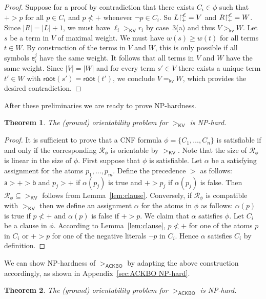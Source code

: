 \documentclass{tlp}
\newcommand{\qed}{\hspace*{1em}\hbox{\proofbox}}
\newtheorem{theorem}{Theorem}[section]
\newcommand{\m}[1]{\mathsf{#1}}
\newcommand{\mc}[1]{\mathcal{#1}}
\newcommand{\mr}[1]{\mathrm{#1}}
\newcommand{\rt}{\m{root}}
\newcommand{\Wt}{\m{w,root}}
\renewcommand{\Wt}{\m{kv}}
\newcommand{\ackbo}{\mr{\m{ACKBO}}}
\newcommand{\KV}{\mr{\m{KV}}}
\newcommand{\seq}[2][n]{{#2_1},\dots,{#2_{#1}}}
\newcommand{\rrs}[3][f]{{#2}{\restriction}^{\smash{#3}}_{#1}}
\newcommand{\RR}{\mc{R}}
\newcommand{\High}{\m{a}}
\newcommand{\Low}{\m{b}}
\newcommand{\ToP}{\m{e}}
\begin{document}
\begin{proof}
Suppose for a proof by contradiction that
there exists $C_i \in \phi$ such that
$+ > p$ for all $p \in C_i$ and
$p \nless +$ whenever $\neg p \in C_i$.
So $\rrs[+]{L}{\nless} = V$ and $\rrs[+]{R}{\nless} = W$.
Since $|R| = |L| + 1$, we must have $\ell_i >_\KV r_i$ by
case~3(a) and thus $V >_\Wt W$.
Let $s$ be a term in $V$ of maximal weight.
We must have $w(s) \geqslant w(t)$ for all terms $t \in W$. By
construction of the terms in $V$ and $W$, this is only possible if all
symbols $\ToP_i^j$ have the same weight. It follows that all terms
in $V$ and $W$ have the same weight. Since $|V| = |W|$ and
for every term $s' \in V$ there exists a unique term
$t' \in W$ with $\rt(s') = \rt(t')$, we conclude
$V =_\Wt W$, which provides the desired contradiction.
\end{proof}

After these preliminaries we are ready to prove NP-hardness.

\begin{theorem}
\label{KV orientation NP-hard}
The (ground) orientability problem for $>_\KV$ is NP-hard.
\end{theorem}
\begin{proof}
It is sufficient to prove that a CNF formula $\phi = \{ \seq{C} \}$ is
satisfiable if and only if the corresponding $\RR_\phi$ is orientable by
$>_\KV$.  Note that the size of $\RR_\phi$ is linear in the size of $\phi$.
First suppose that $\phi$ is satisfiable. Let $\alpha$ be a satisfying
assignment for the atoms $\seq[m]{p}$. Define the precedence $>$ as
follows: $\High > + > \Low$ and $p_j > +$ if $\alpha(p_j)$ is true and
$+ > p_j$ if $\alpha(p_j)$ is false.
Then $\RR_\phi \subseteq {>_\KV}$ follows from Lemma~\ref{lem:clause}.
Conversely, if $\RR_\phi$ is compatible with $>_\KV$ then we define
an assignment $\alpha$ for the atoms in $\phi$ as follows:
$\alpha(p)$ is true if $p \nless +$ and
$\alpha(p)$ is false if $+ > p$.
We claim that
$\alpha$ satisfies $\phi$. Let $C_i$ be a clause in $\phi$.
According to Lemma~\ref{lem:clause}, $p \nless +$ for one of
the atoms $p$ in $C_i$ or $+ > p$ for one of the negative
literals $\neg p$ in $C_i$. Hence $\alpha$ satisfies $C_i$ by
definition.
\end{proof}

We can show NP-hardness of $>_\ackbo$ by adapting the above
construction accordingly, as shown in
Appendix~\ref{sec:ACKBO NP-hard}.

\begin{theorem}
\label{ACKBO orientation NP-hard}
The (ground) orientability problem for $>_\ackbo$ is NP-hard.
\qed
\end{theorem}
\end{document}
